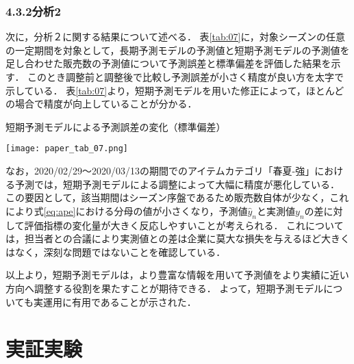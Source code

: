 \documentclass[dvipdfmx]{jreport}
\begin{document}
\subsubsection{4.3.2\hspace{10pt}分析2}
次に，分析２に関する結果について述べる．
表\ref{tab:07}に，対象シーズンの任意の一定期間を対象として，長期予測モデルの予測値と短期予測モデルの予測値を足し合わせた販売数の予測値について予測誤差と標準偏差を評価した結果を示す．
このとき調整前と調整後で比較し予測誤差が小さく精度が良い方を太字で示している．
表\ref{tab:07}より，短期予測モデルを用いた修正によって，ほとんどの場合で精度が向上していることが分かる．

\begin{table}[h]
    \begin{center}
        \caption{短期予測モデルによる予測誤差の変化（標準偏差）} \label{tab:07}
        \texttt{[image: paper\_tab\_07.png]}
    \end{center}
\end{table}

なお，2020/02/29～2020/03/13の期間でのアイテムカテゴリ「春夏-強」における予測では，短期予測モデルによる調整によって大幅に精度が悪化している．
この要因として，該当期間はシーズン序盤であるため販売数自体が少なく，これにより式\eqref{eq:ape}における分母の値が小さくなり，予測値$\hat{y}_n$と実測値$y_n$の差に対して評価指標の変化量が大きく反応しやすいことが考えられる．
これについては，担当者との合議により実測値との差は企業に莫大な損失を与えるほど大きくはなく，深刻な問題ではないことを確認している．

以上より，短期予測モデルは，より豊富な情報を用いて予測値をより実績に近い方向へ調整する役割を果たすことが期待できる．
よって，短期予測モデルについても実運用に有用であることが示された．


\section{実証実験}\label{実証実験}
\end{document}
